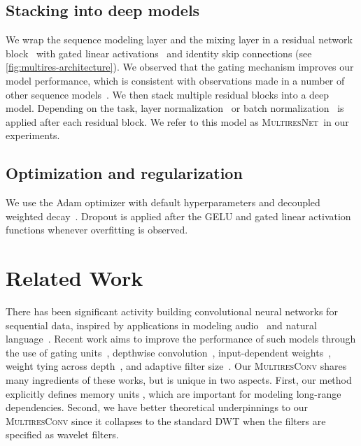 \documentclass{article}
\theoremstyle{plain}
\theoremstyle{definition}
\theoremstyle{remark}
\newcommand{\ourmodel}{\textsc{MultiresNet}}
\begin{document}
\subsection{Stacking into deep models}

We wrap the sequence modeling layer and the mixing layer in a residual network block~\citep{he2016deep} with gated linear activations~\citep{dauphin2017language} and identity skip connections (see \cref{fig:multires-architecture}). 
We observed that the gating mechanism improves our model performance, which is consistent with observations made in a number of other sequence models~\citep{dauphin2017language, van2016conditional, oord2016wavenet, gu2021efficiently}. 
We then stack multiple residual blocks into a deep model. 
Depending on the task, layer normalization~\citep{ba2016layer} or batch normalization~\citep{ioffe2015batch} is applied after each residual block. 
We refer to this model as \ourmodel\ in our experiments. 


\subsection{Optimization and regularization} 
We use the Adam optimizer with default hyperparameters and decoupled weighted decay~\citep{loshchilov2018decoupled}. 
Dropout is applied after the GELU and gated linear activation functions whenever overfitting is observed.












\section{Related Work}
\label{sec:related-work}

There has been significant activity building convolutional neural networks for sequential data, inspired by applications in modeling audio~\citep{waibel1989phoneme,oord2016wavenet} and natural language~\citep{collobert2011natural,kalchbrenner2016neural}. 
Recent work aims to improve the performance of such models through the use of gating units~\citep{dauphin2017language}, depthwise convolution~\citep{kaiserdepthwise}, input-dependent weights~\citep{shen2018learning,wu2018pay}, weight tying across depth~\citep{bai2019trellis}, and adaptive filter size~\cite{romero2022flexconv}. 
Our \textsc{MultiresConv} shares many ingredients of these works, but is unique in two aspects. 
First, our method explicitly defines memory units ,  which are important for modeling long-range dependencies. 
Second, we have better theoretical underpinnings to our \textsc{MultiresConv} since it collapses to the standard DWT when the filters are specified as wavelet filters.
\end{document}
